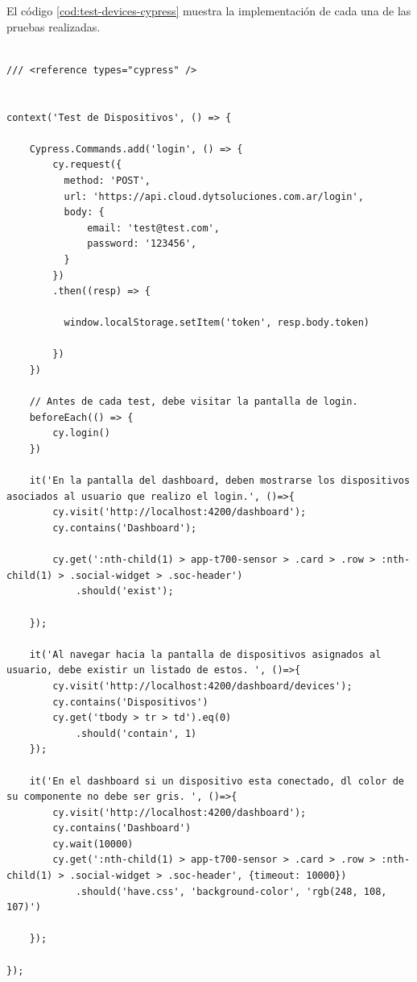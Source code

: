 El código \ref{cod:test-devices-cypress} muestra la implementación de cada una de las pruebas realizadas. 

\begin{lstlisting}[label=cod:test-devices-cypress,caption=Código de implementación para tests realizados en la interacción de usuarios con dispositivos que se encuentran en el sistema.] 

/// <reference types="cypress" />


context('Test de Dispositivos', () => {
    
    Cypress.Commands.add('login', () => { 
        cy.request({
          method: 'POST',
          url: 'https://api.cloud.dytsoluciones.com.ar/login',
          body: {
              email: 'test@test.com',
              password: '123456',      
          }
        })
        .then((resp) => {
        
          window.localStorage.setItem('token', resp.body.token)
          
        })
    })

    // Antes de cada test, debe visitar la pantalla de login.
    beforeEach(() => {
        cy.login()  
    })

    it('En la pantalla del dashboard, deben mostrarse los dispositivos asociados al usuario que realizo el login.', ()=>{
        cy.visit('http://localhost:4200/dashboard');
        cy.contains('Dashboard');

        cy.get(':nth-child(1) > app-t700-sensor > .card > .row > :nth-child(1) > .social-widget > .soc-header')
            .should('exist');
      
    });

    it('Al navegar hacia la pantalla de dispositivos asignados al usuario, debe existir un listado de estos. ', ()=>{
        cy.visit('http://localhost:4200/dashboard/devices');
        cy.contains('Dispositivos')
        cy.get('tbody > tr > td').eq(0)
            .should('contain', 1)
    });

    it('En el dashboard si un dispositivo esta conectado, dl color de su componente no debe ser gris. ', ()=>{
        cy.visit('http://localhost:4200/dashboard');
        cy.contains('Dashboard')       
        cy.wait(10000)
        cy.get(':nth-child(1) > app-t700-sensor > .card > .row > :nth-child(1) > .social-widget > .soc-header', {timeout: 10000})
            .should('have.css', 'background-color', 'rgb(248, 108, 107)')
        
    });

});

\end{lstlisting}


